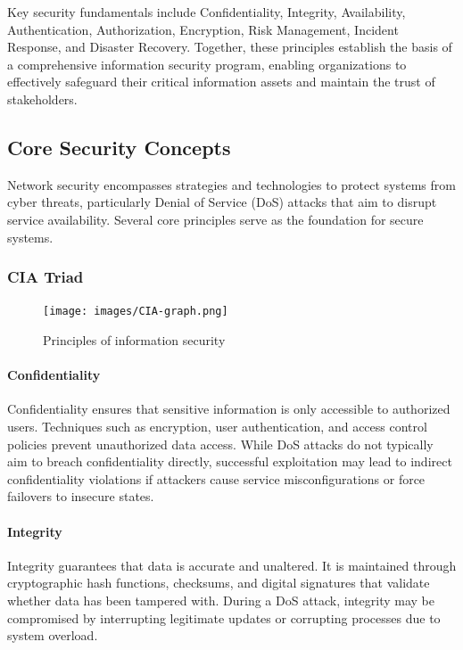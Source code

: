 \documentclass[12pt]{report}
\begin{document}
Key security fundamentals include Confidentiality, Integrity, Availability, Authentication, Authorization, Encryption, Risk Management, Incident Response, and Disaster Recovery. Together, these principles establish the basis of a comprehensive information security program, enabling organizations to effectively safeguard their critical information assets and maintain the trust of stakeholders.\cite{ibm_security_fundamental}

\subsection{Core Security Concepts}
Network security encompasses strategies and technologies to protect systems from cyber threats, particularly Denial of Service (DoS) attacks that aim to disrupt service availability. Several core principles serve as the foundation for secure systems.

\subsubsection{CIA Triad}
\begin{figure}[ht]
    \centering
    \texttt{[image: images/CIA-graph.png]}
    \caption{Principles of information security}
    \label{fig:cia-graph}
\end{figure}

\paragraph{Confidentiality} 
Confidentiality ensures that sensitive information is only accessible to authorized users. Techniques such as encryption, user authentication, and access control policies prevent unauthorized data access. While DoS attacks do not typically aim to breach confidentiality directly, successful exploitation may lead to indirect confidentiality violations if attackers cause service misconfigurations or force failovers to insecure states.

\paragraph{Integrity} 
Integrity guarantees that data is accurate and unaltered. It is maintained through cryptographic hash functions, checksums, and digital signatures that validate whether data has been tampered with. During a DoS attack, integrity may be compromised by interrupting legitimate updates or corrupting processes due to system overload.
\end{document}
